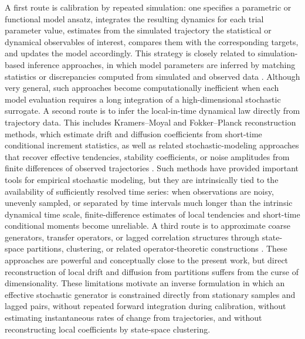 \documentclass[11pt,twoside,fleqn]{article}
\begin{document}
A first route is calibration by repeated simulation: one specifies a parametric or functional model ansatz, integrates the resulting dynamics for each trial parameter value, estimates from the simulated trajectory the statistical or dynamical observables of interest, compares them with the corresponding targets, and updates the model accordingly. This strategy is closely related to simulation-based inference approaches, in which model parameters are inferred by matching statistics or discrepancies computed from simulated and observed data \cite{DuffieSingleton1993,GourierouxMonfortRenault1993,GutmannCorander2016}. Although very general, such approaches become computationally inefficient when each model evaluation requires a long integration of a high-dimensional stochastic surrogate. A second route is to infer the local-in-time dynamical law directly from trajectory data. This includes Kramers--Moyal and Fokker--Planck reconstruction methods, which estimate drift and diffusion coefficients from short-time conditional increment statistics, as well as related stochastic-modeling approaches that recover effective tendencies, stability coefficients, or noise amplitudes from finite differences of observed trajectories \cite{Friedrich1997,Siegert1998,RagwitzKantz2001,PenlandSardeshmukh1995,giorgini2022non,keyes2023stochastic}. Such methods have provided important tools for empirical stochastic modeling, but they are intrinsically tied to the availability of sufficiently resolved time series: when observations are noisy, unevenly sampled, or separated by time intervals much longer than the intrinsic dynamical time scale, finite-difference estimates of local tendencies and short-time conditional moments become unreliable. A third route is to approximate coarse generators, transfer operators, or lagged correlation structures through state-space partitions, clustering, or related operator-theoretic constructions \cite{GivonKupfermanStuart2004,BotvinickGreenhouse2023,BotvinickGreenhouse2025,SantosGutierrezLucariniChekrounGhil2021,falasca2024data,falasca2025FDT,giorgini2025learning,giorgini2024reduced,souza2024representing_a,souza2024representing_b,souza2024modified}. These approaches are powerful and conceptually close to the present work, but direct reconstruction of local drift and diffusion from partitions suffers from the curse of dimensionality. These limitations motivate an inverse formulation in which an effective stochastic generator is constrained directly from stationary samples and lagged pairs, without repeated forward integration during calibration, without estimating instantaneous rates of change from trajectories, and without reconstructing local coefficients by state-space clustering.
\end{document}

